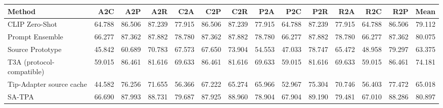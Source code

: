 \begin{tabular}{lrrrrrrrrrrrrr}
\toprule
Method & A2C & A2P & A2R & C2A & C2P & C2R & P2A & P2C & P2R & R2A & R2C & R2P & Mean \\
\midrule
CLIP Zero-Shot & 64.788 & 86.506 & 87.239 & 77.915 & 86.506 & 87.239 & 77.915 & 64.788 & 87.239 & 77.915 & 64.788 & 86.506 & 79.112 \\
Prompt Ensemble & 66.277 & 87.362 & 87.882 & 78.780 & 87.362 & 87.882 & 78.780 & 66.277 & 87.882 & 78.780 & 66.277 & 87.362 & 80.075 \\
Source Prototype & 45.842 & 60.689 & 70.783 & 67.573 & 67.650 & 73.904 & 54.553 & 47.033 & 78.747 & 65.472 & 48.958 & 79.297 & 63.375 \\
T3A (protocol-compatible) & 59.015 & 86.461 & 81.616 & 69.633 & 86.461 & 81.616 & 69.633 & 59.015 & 81.616 & 69.633 & 59.015 & 86.461 & 74.181 \\
Tip-Adapter source cache & 44.582 & 76.256 & 71.655 & 56.366 & 67.222 & 65.274 & 65.966 & 52.967 & 75.304 & 70.746 & 56.403 & 77.472 & 65.018 \\
SA-TPA & 66.690 & 87.993 & 88.731 & 79.687 & 87.925 & 88.960 & 78.904 & 67.904 & 89.190 & 79.481 & 67.010 & 88.286 & 80.897 \\
\bottomrule
\end{tabular}
